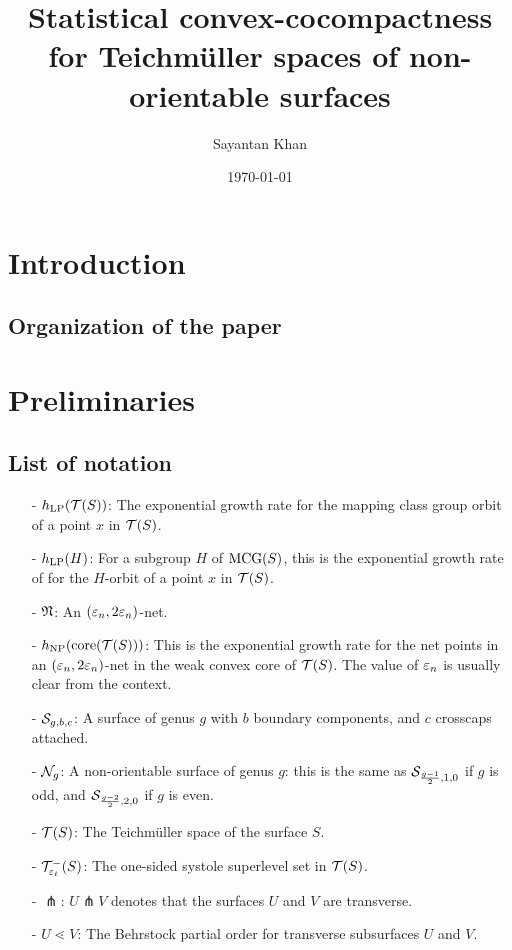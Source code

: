 \documentclass[12pt, reqno]{amsart}
\title[Statistical convex-cocompactness for $\teich(\no_g)$]{Statistical convex-cocompactness for Teichmüller spaces of non-orientable surfaces}
\author{Sayantan Khan}
\date{\today}
\begin{document}
\begin{abstract}

\end{abstract}
\maketitle
\tableofcontents


\section{Introduction}
\label{sec:introduction}



\subsection*{Organization of the paper}

\section{Preliminaries}
\label{sec:preliminaries}

\subsection*{List of notation}
\begin{itemize}
\item[-] $h_{\mathrm{LP}}(\mathcal{T}(S))$: The exponential growth rate for the mapping class group orbit of a point $x$ in $\mathcal{T}(S)$.
\item[-] $h_{\mathrm{LP}}(H)$: For a subgroup $H$ of $\mathrm{MCG}(S)$, this is the exponential growth rate of for the $H$-orbit of a point $x$ in $\mathcal{T}(S)$.
\item[-] $\mathfrak{N}$: An $(\varepsilon_n, 2\varepsilon_n)$-net.
\item[-] $h_{\mathrm{NP}}(\mathrm{core}(\mathcal{T}(S)))$: This is the exponential growth rate for the net points in an $(\varepsilon_n, 2 \varepsilon_n)$-net in the weak convex core of $\mathcal{T}(S)$. The value of $\varepsilon_n$ is usually clear from the context.
\item[-] $\mathcal{S}_{g,b,c}$: A surface of genus $g$ with $b$ boundary components, and $c$ crosscaps attached.
\item[-] $\mathcal{N}_g$: A non-orientable surface of genus $g$: this is the same as $\mathcal{S}_{\frac{g-1}{2}, 1, 0}$ if $g$ is odd, and $\mathcal{S}_{\frac{g-2}{2}, 2, 0}$ if $g$ is even.
\item[-] $\mathcal{T}(S)$: The Teichmüller space of the surface $S$.
\item[-] $\mathcal{T}_{\varepsilon_t}^{-}(S)$: The one-sided systole superlevel set in $\mathcal{T}(S)$.
\item[-] $\pitchfork$: $U \pitchfork V$ denotes that the surfaces $U$ and $V$ are transverse.
\item[-] $U \lessdot V$: The Behrstock partial order for transverse subsurfaces $U$ and $V$.
\end{itemize}
\end{document}
